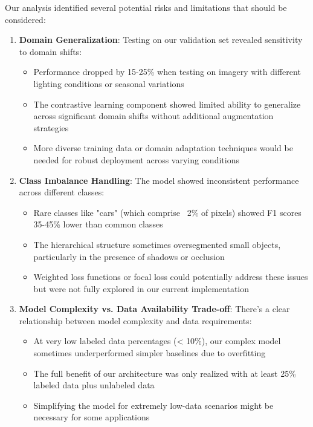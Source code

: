 \documentclass[conference]{IEEEtran}
\begin{document}
Our analysis identified several potential risks and limitations that should be considered:

\begin{enumerate}
    \item \textbf{Domain Generalization}: Testing on our validation set revealed sensitivity to domain shifts:
    \begin{itemize}
        \item Performance dropped by 15-25\% when testing on imagery with different lighting conditions or seasonal variations
        \item The contrastive learning component showed limited ability to generalize across significant domain shifts without additional augmentation strategies
        \item More diverse training data or domain adaptation techniques would be needed for robust deployment across varying conditions
    \end{itemize}
    
    \item \textbf{Class Imbalance Handling}: The model showed inconsistent performance across different classes:
    \begin{itemize}
        \item Rare classes like "cars" (which comprise ~2\% of pixels) showed F1 scores 35-45\% lower than common classes
        \item The hierarchical structure sometimes oversegmented small objects, particularly in the presence of shadows or occlusion
        \item Weighted loss functions or focal loss could potentially address these issues but were not fully explored in our current implementation
    \end{itemize}
    
    \item \textbf{Model Complexity vs. Data Availability Trade-off}: There's a clear relationship between model complexity and data requirements:
    \begin{itemize}
        \item At very low labeled data percentages (< 10\%), our complex model sometimes underperformed simpler baselines due to overfitting
        \item The full benefit of our architecture was only realized with at least 25\% labeled data plus unlabeled data
        \item Simplifying the model for extremely low-data scenarios might be necessary for some applications
    \end{itemize}
    

\end{enumerate}
\end{document}
